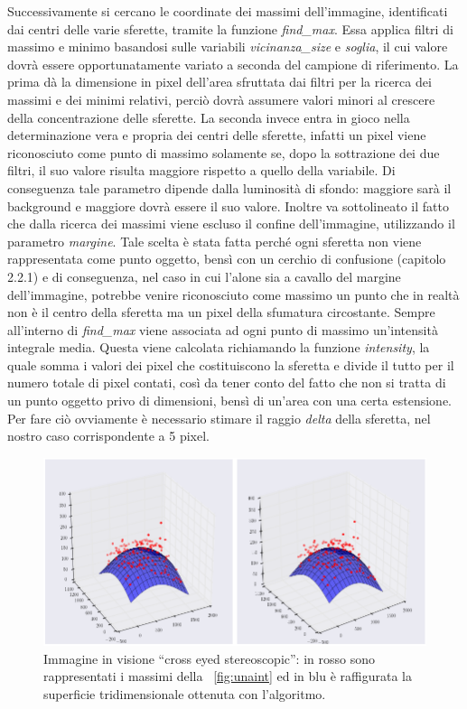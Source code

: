 Successivamente si cercano le coordinate dei massimi dell'immagine, identificati dai centri delle varie sferette, tramite la funzione \textit{find\_max}. 
Essa applica filtri di massimo e minimo basandosi sulle variabili \textit{vicinanza\_size} e \textit{soglia}, il cui valore dovrà essere opportunatamente variato a seconda del campione di riferimento. 
La prima dà la dimensione in pixel dell'area sfruttata dai filtri per la ricerca dei massimi e dei minimi relativi, perciò dovrà assumere valori minori al crescere della concentrazione delle sferette. 
La seconda invece entra in gioco nella determinazione vera e propria dei centri delle sferette, infatti un pixel viene riconosciuto come punto di massimo solamente se, dopo la sottrazione dei due filtri, il suo valore risulta maggiore rispetto a quello della variabile. 
Di conseguenza tale parametro dipende dalla luminosità di sfondo: maggiore sarà il background e maggiore dovrà essere il suo valore.
Inoltre va sottolineato il fatto che dalla ricerca dei massimi viene escluso il confine dell'immagine, utilizzando il parametro \textit{margine}. 
Tale scelta è stata fatta perché ogni sferetta non viene rappresentata come punto oggetto, bensì con un cerchio di confusione (capitolo 2.2.1) e di conseguenza, nel caso in cui l'alone sia a cavallo del margine dell'immagine, potrebbe venire riconosciuto come massimo un punto che in realtà non è il centro della sferetta ma un pixel della sfumatura circostante.
Sempre all'interno di \textit{find\_max} viene associata ad ogni punto di massimo un'intensità integrale media. 
Questa viene calcolata richiamando la funzione \textit{intensity}, la quale somma i valori dei pixel che costituiscono la sferetta e divide il tutto per il numero totale di pixel contati, così da tener conto del fatto che non si tratta di un punto oggetto privo di dimensioni, bensì di un'area con una certa estensione. 
Per fare ciò ovviamente è necessario stimare il raggio \textit{delta} della sferetta, nel nostro caso corrispondente a 5 pixel.

\begin{figure}
 \centering
 \includegraphics[scale=0.45]{img/CAP3gauss.png}
 \caption{\small{Immagine in visione ``cross eyed stereoscopic'': in rosso sono rappresentati i massimi della \figurename~\ref{fig:unaint} ed in blu è raffigurata la superficie tridimensionale ottenuta con l'algoritmo.}}
 \label{fig:gauss}
\end{figure}


